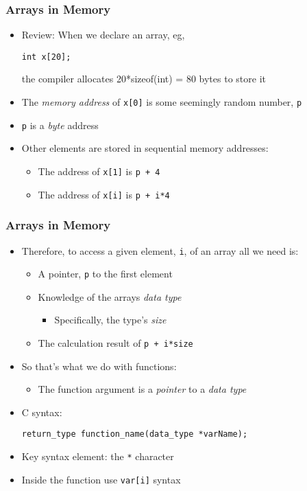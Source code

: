 \documentclass[14pt]{beamer}
\begin{document}
\begin{frame}[fragile]
\frametitle{Arrays in Memory}
\begin{itemize}
\item Review: When we declare an array, eg,
\begin{lstlisting}[style=CStyle]
int x[20];
\end{lstlisting}
the compiler allocates 20*sizeof(int) = 80 bytes to store it
\item The \textit{memory address} of \texttt{x[0]} is some seemingly random number, \texttt{p}
\item \texttt{p} is a \textit{byte} address
\item Other elements are stored in sequential memory addresses:
	\begin{itemize}
		\item The address of \texttt{x[1]} is \texttt{p + 4}
		\item The address of \texttt{x[i]} is \texttt{p + i*4}
	\end{itemize}
\end{itemize}
\end{frame}

\begin{frame}[fragile]
\frametitle{Arrays in Memory}
\begin{itemize}
\item Therefore, to access a given element, \texttt{i}, of an array all we need is:
	\begin{itemize}
		\item A pointer, \texttt{p} to the first element
		\item Knowledge of the arrays \textit{data type}
			\begin{itemize}
				\item Specifically, the type's \textit{size}
			\end{itemize}
		\item The calculation result of \texttt{p + i*size}
	\end{itemize}
\pause
\item So that's what we do with functions:
	\begin{itemize}
		\item The function argument is a \textit{pointer} to a \textit{data type}
	\end{itemize}
\pause
\item C syntax:
\begin{lstlisting}[style=CStyle]
return_type function_name(data_type *varName);
\end{lstlisting}
\item Key syntax element: the \texttt{*} character
\pause
\item Inside the function use \texttt{var[i]} syntax
\end{itemize}
\end{frame}
\end{document}
